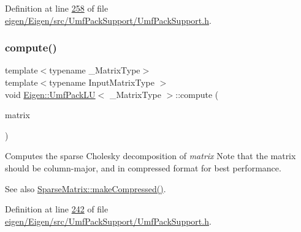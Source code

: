 Definition at line \hyperlink{eigen_2_eigen_2src_2_umf_pack_support_2_umf_pack_support_8h_source_l00258}{258} of file \hyperlink{eigen_2_eigen_2src_2_umf_pack_support_2_umf_pack_support_8h_source}{eigen/\+Eigen/src/\+Umf\+Pack\+Support/\+Umf\+Pack\+Support.\+h}.

\mbox{\label{class_eigen_1_1_umf_pack_l_u_a05fb2b5717ebd67e46b83439721ceee7}} 
\subsubsection{\texorpdfstring{compute()}{compute()}\hspace{0.1cm}{\footnotesize\ttfamily [1/2]}}
{\footnotesize\ttfamily template$<$typename \+\_\+\+Matrix\+Type$>$ \\
template$<$typename Input\+Matrix\+Type $>$ \\
void \hyperlink{class_eigen_1_1_umf_pack_l_u}{Eigen\+::\+Umf\+Pack\+LU}$<$ \+\_\+\+Matrix\+Type $>$\+::compute (\begin{DoxyParamCaption}\item[{const Input\+Matrix\+Type \&}]{matrix }\end{DoxyParamCaption})\hspace{0.3cm}{\ttfamily [inline]}}

Computes the sparse Cholesky decomposition of {\itshape matrix} Note that the matrix should be column-\/major, and in compressed format for best performance. \begin{DoxySeeAlso}{See also}
\hyperlink{group___sparse_core___module_a5ff54ffc10296f9466dc81fa888733fd}{Sparse\+Matrix\+::make\+Compressed()}. 
\end{DoxySeeAlso}


Definition at line \hyperlink{eigen_2_eigen_2src_2_umf_pack_support_2_umf_pack_support_8h_source_l00242}{242} of file \hyperlink{eigen_2_eigen_2src_2_umf_pack_support_2_umf_pack_support_8h_source}{eigen/\+Eigen/src/\+Umf\+Pack\+Support/\+Umf\+Pack\+Support.\+h}.

\mbox{\label{class_eigen_1_1_umf_pack_l_u_a05fb2b5717ebd67e46b83439721ceee7}} 
